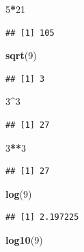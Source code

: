 \documentclass[
]{book}
\newenvironment{Shaded}{\begin{snugshade}}{\end{snugshade}}
\newcommand{\DecValTok}[1]{\textcolor[rgb]{0.00,0.00,0.81}{#1}}
\newcommand{\FunctionTok}[1]{\textcolor[rgb]{0.13,0.29,0.53}{\textbf{#1}}}
\newcommand{\NormalTok}[1]{#1}
\newcommand{\SpecialCharTok}[1]{\textcolor[rgb]{0.81,0.36,0.00}{\textbf{#1}}}
\theoremstyle{definition}
\theoremstyle{definition}
\theoremstyle{definition}
\theoremstyle{definition}
\theoremstyle{remark}
\begin{document}
\begin{Shaded}
\begin{Highlighting}[]
\DecValTok{5}\SpecialCharTok{*}\DecValTok{21}
\end{Highlighting}
\end{Shaded}

\begin{verbatim}
## [1] 105
\end{verbatim}

\begin{Shaded}
\begin{Highlighting}[]
\FunctionTok{sqrt}\NormalTok{(}\DecValTok{9}\NormalTok{)}
\end{Highlighting}
\end{Shaded}

\begin{verbatim}
## [1] 3
\end{verbatim}

\begin{Shaded}
\begin{Highlighting}[]
\DecValTok{3}\SpecialCharTok{\^{}}\DecValTok{3}
\end{Highlighting}
\end{Shaded}

\begin{verbatim}
## [1] 27
\end{verbatim}

\begin{Shaded}
\begin{Highlighting}[]
\DecValTok{3}\SpecialCharTok{**}\DecValTok{3}
\end{Highlighting}
\end{Shaded}

\begin{verbatim}
## [1] 27
\end{verbatim}

\begin{Shaded}
\begin{Highlighting}[]
\FunctionTok{log}\NormalTok{(}\DecValTok{9}\NormalTok{)}
\end{Highlighting}
\end{Shaded}

\begin{verbatim}
## [1] 2.197225
\end{verbatim}

\begin{Shaded}
\begin{Highlighting}[]
\FunctionTok{log10}\NormalTok{(}\DecValTok{9}\NormalTok{)}
\end{Highlighting}
\end{Shaded}
\end{document}
